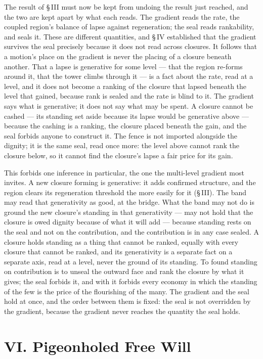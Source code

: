 \documentclass[11pt,oneside]{report}
\theoremstyle{definition}
\theoremstyle{remark}
\begin{document}
The result of \S\,III must now be kept from undoing the result just reached, and the two are kept apart by what each reads. The gradient reads the rate, the coupled region's balance of lapse against regeneration; the seal reads rankability, and seals it. These are different quantities, and \S\,IV established that the gradient survives the seal precisely because it does not read across closures. It follows that a motion's place on the gradient is never the placing of a closure beneath another. That a lapse is generative for some level --- that the region re-forms around it, that the tower climbs through it --- is a fact about the rate, read at a level, and it does not become a ranking of the closure that lapsed beneath the level that gained, because rank is sealed and the rate is blind to it. The gradient says what is generative; it does not say what may be spent. A closure cannot be cashed --- its standing set aside because its lapse would be generative above --- because the cashing is a ranking, the closure placed beneath the gain, and the seal forbids anyone to construct it. The fence is not imported alongside the dignity; it is the same seal, read once more: the level above cannot rank the closure below, so it cannot find the closure's lapse a fair price for its gain.

This forbids one inference in particular, the one the multi-level gradient most invites. A new closure forming is generative: it adds confirmed structure, and the region clears its regeneration threshold the more easily for it (\S\,III). The band may read that generativity as good, at the bridge. What the band may not do is ground the new closure's standing in that generativity --- may not hold that the closure is owed dignity because of what it will add --- because standing rests on the seal and not on the contribution, and the contribution is in any case sealed. A closure holds standing as a thing that cannot be ranked, equally with every closure that cannot be ranked, and its generativity is a separate fact on a separate axis, read at a level, never the ground of its standing. To found standing on contribution is to unseal the outward face and rank the closure by what it gives; the seal forbids it, and with it forbids every economy in which the standing of the few is the price of the flourishing of the many. The gradient and the seal hold at once, and the order between them is fixed: the seal is not overridden by the gradient, because the gradient never reaches the quantity the seal holds.

\section*{VI. Pigeonholed Free Will}
\end{document}
